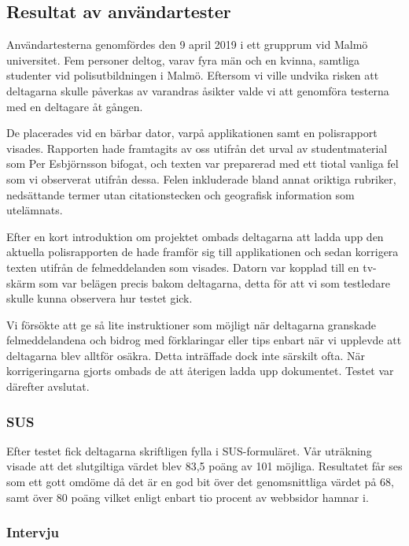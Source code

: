 \documentclass[swedish]{maucsthesis}
\begin{document}
\subsection{Resultat av användartester}

Användartesterna genomfördes den 9 april 2019 i ett grupprum vid Malmö
universitet. Fem personer deltog, varav fyra män och en kvinna, samtliga
studenter vid polisutbildningen i Malmö. Eftersom vi ville undvika risken att
deltagarna skulle påverkas av varandras åsikter valde vi att genomföra testerna
med en deltagare åt gången.

De placerades vid en bärbar dator, varpå applikationen samt en polisrapport
visades. Rapporten hade framtagits av oss utifrån det urval av studentmaterial
som Per Esbjörnsson bifogat, och texten var preparerad med ett tiotal vanliga
fel som vi observerat utifrån dessa. Felen inkluderade bland annat oriktiga
rubriker, nedsättande termer utan citationstecken och geografisk information som
utelämnats.

Efter en kort introduktion om projektet ombads deltagarna att ladda upp den
aktuella polisrapporten de hade framför sig till applikationen och sedan
korrigera texten utifrån de felmeddelanden som visades. Datorn var kopplad till
en tv-skärm som var belägen precis bakom deltagarna, detta för att vi som
testledare skulle kunna observera hur testet gick.

Vi försökte att ge så lite instruktioner som möjligt när deltagarna granskade
felmeddelandena och bidrog med förklaringar eller tips enbart när vi upplevde
att deltagarna blev alltför osäkra. Detta inträffade dock inte särskilt ofta.
När korrigeringarna gjorts ombads de att återigen ladda upp dokumentet. Testet
var därefter avslutat.

\subsubsection{SUS}

Efter testet fick deltagarna skriftligen fylla i SUS-formuläret. Vår uträkning
visade att det slutgiltiga värdet blev 83,5 poäng av 101 möjliga. Resultatet får
ses som ett gott omdöme då det är en god bit över det genomsnittliga värdet på
68, samt över 80 poäng vilket enligt \cite{laubheimer:2018} enbart tio procent av
webbsidor hamnar i.

\subsubsection{Intervju}
\end{document}
